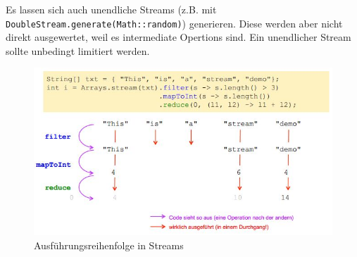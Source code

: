 Es lassen sich auch unendliche Streams (z.B. mit \verb|DoubleStream.generate(Math::random)|) generieren. Diese werden aber nicht direkt ausgewertet, weil es intermediate Opertions sind. Ein unendlicher Stream sollte unbedingt limitiert werden.

\begin{figure}[h!]
\centering
\includegraphics[width=0.4\linewidth]{fig/java-stream-executions}
\caption{Ausführungsreihenfolge in Streams}
\label{fig:java-stream-executions}
\end{figure}
